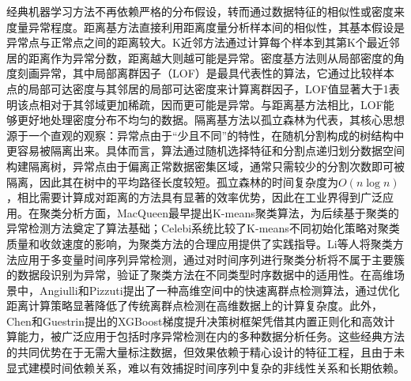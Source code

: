 经典机器学习方法不再依赖严格的分布假设，转而通过数据特征的相似性或密度来度量异常程度。距离基方法直接利用距离度量分析样本间的相似性，其基本假设是异常点与正常点之间的距离较大。K近邻方法\cite{ramaswamy2000}通过计算每个样本到其第K个最近邻居的距离作为异常分数，距离越大则越可能是异常。密度基方法则从局部密度的角度刻画异常，其中局部离群因子（LOF）\cite{breunig2000lof}是最具代表性的算法，它通过比较样本点的局部可达密度与其邻居的局部可达密度来计算离群因子，LOF值显著大于1表明该点相对于其邻域更加稀疏，因而更可能是异常。与距离基方法相比，LOF能够更好地处理密度分布不均匀的数据。隔离基方法以孤立森林\cite{liu2008isolation}为代表，其核心思想源于一个直观的观察：异常点由于``少且不同''的特性，在随机分割构成的树结构中更容易被隔离出来。具体而言，算法通过随机选择特征和分割点递归划分数据空间构建隔离树，异常点由于偏离正常数据密集区域，通常只需较少的分割次数即可被隔离，因此其在树中的平均路径长度较短。孤立森林的时间复杂度为$O(n\log n)$，相比需要计算成对距离的方法具有显著的效率优势，因此在工业界得到广泛应用。在聚类分析方面，MacQueen\cite{macqueen1967kmeans}最早提出K-means聚类算法，为后续基于聚类的异常检测方法奠定了算法基础；Celebi\cite{celebi2013kmeans}系统比较了K-means不同初始化策略对聚类质量和收敛速度的影响，为聚类方法的合理应用提供了实践指导。Li等人\cite{li2021clustering}将聚类方法应用于多变量时间序列异常检测，通过对时间序列进行聚类分析将不属于主要簇的数据段识别为异常，验证了聚类方法在不同类型时序数据中的适用性。在高维场景中，Angiulli和Pizzuti\cite{angiulli2002outlier}提出了一种高维空间中的快速离群点检测算法，通过优化距离计算策略显著降低了传统离群点检测在高维数据上的计算复杂度。此外，Chen和Guestrin\cite{chen2016xgboost}提出的XGBoost梯度提升决策树框架凭借其内置正则化和高效计算能力，被广泛应用于包括时序异常检测在内的多种数据分析任务。这些经典方法的共同优势在于无需大量标注数据，但效果依赖于精心设计的特征工程，且由于未显式建模时间依赖关系，难以有效捕捉时间序列中复杂的非线性关系和长期依赖。

